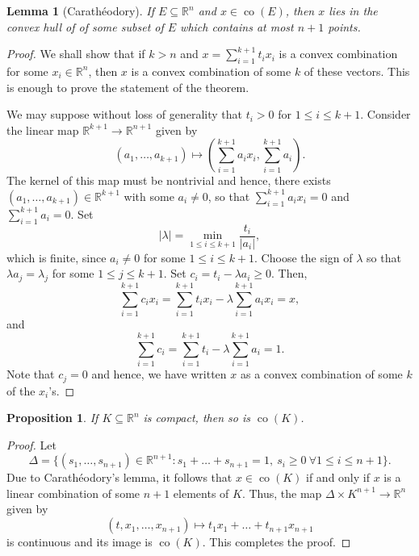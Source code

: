 \documentclass[11pt]{article}
\theoremstyle{thmstyle}
\newtheorem{lemma}[theorem]{Lemma}
\newtheorem{proposition}[theorem]{Proposition}
\theoremstyle{defstyle}
\newcommand{\R}{\mathbb{R}}
\renewcommand{\le}{\leqslant}
\renewcommand{\ge}{\geqslant}
\newcommand{\co}{\operatorname{co}}
\begin{document}
\begin{lemma}[Carath\'eodory]
    If $E\subseteq\R^n$ and $x\in\co(E)$, then $x$ lies in the convex hull of of some subset of $E$ which contains at most $n + 1$ points.
\end{lemma}
\begin{proof}
    We shall show that if $k > n$ and $x = \displaystyle\sum_{i = 1}^{k + 1}t_ix_i$ is a convex combination for some $x_i\in\R^n$, then $x$ is a convex combination of some $k$ of these vectors. This is enough to prove the statement of the theorem.

    We may suppose without loss of generality that $t_i > 0$ for $1\le i\le k + 1$. Consider the linear map $\R^{k + 1}\to\R^{n + 1}$ given by 
    \begin{equation*}
        (a_1,\dots, a_{k + 1})\mapsto\left(\sum_{i = 1}^{k + 1} a_ix_i, \sum_{i = 1}^{k + 1}a_i\right).
    \end{equation*}
    The kernel of this map must be nontrivial and hence, there exists $(a_1,\dots, a_{k + 1})\in\R^{k + 1}$ with some $a_i\ne 0$, so that $\sum_{i = 1}^{k + 1}a_ix_i = 0$ and $\sum_{i = 1}^{k + 1}a_i = 0$. Set
    \begin{equation*}
        |\lambda| = \min_{1\le i\le k + 1}\frac{t_i}{|a_i|},
    \end{equation*}
    which is finite, since $a_i\ne 0$ for some $1\le i\le k + 1$. Choose the sign of $\lambda$ so that $\lambda a_j = \lambda_j$ for some $1\le j\le k + 1$. Set $c_i = t_i - \lambda a_i\ge 0$. Then, 
    \begin{equation*}
        \sum_{i = 1}^{k + 1}c_ix_i = \sum_{i = 1}^{k + 1}t_ix_i - \lambda\sum_{i = 1}^{k + 1}a_ix_i = x,
    \end{equation*}
    and 
    \begin{equation*}
        \sum_{i = 1}^{k + 1} c_i = \sum_{i = 1}^{k + 1}t_i - \lambda\sum_{i = 1}^{k + 1}a_i = 1.
    \end{equation*}
    Note that $c_j = 0$ and hence, we have written $x$ as a convex combination of some $k$ of the $x_i$'s.
\end{proof}

\begin{proposition}
    If $K\subseteq\R^n$ is compact, then so is $\co(K)$.
\end{proposition}
\begin{proof}
    Let 
    \begin{equation*}
        \Delta = \{(s_1,\dots, s_{n + 1})\in\R^{n + 1}\colon s_1 + \dots + s_{n + 1} = 1,~s_i\ge 0~\forall 1\le i\le n + 1\}.
    \end{equation*}
    Due to Carath\'eodory's lemma, it follows that $x\in\co(K)$ if and only if $x$ is a linear combination of some $n + 1$ elements of $K$. Thus, the map $\Delta\times K^{n + 1}\to \R^{n}$ given by 
    \begin{equation*}
        (t, x_1,\dots, x_{n + 1})\mapsto t_1x_1 + \dots + t_{n + 1}x_{n + 1}
    \end{equation*}
    is continuous and its image is $\co(K)$. This completes the proof.
\end{proof}
\end{document}
